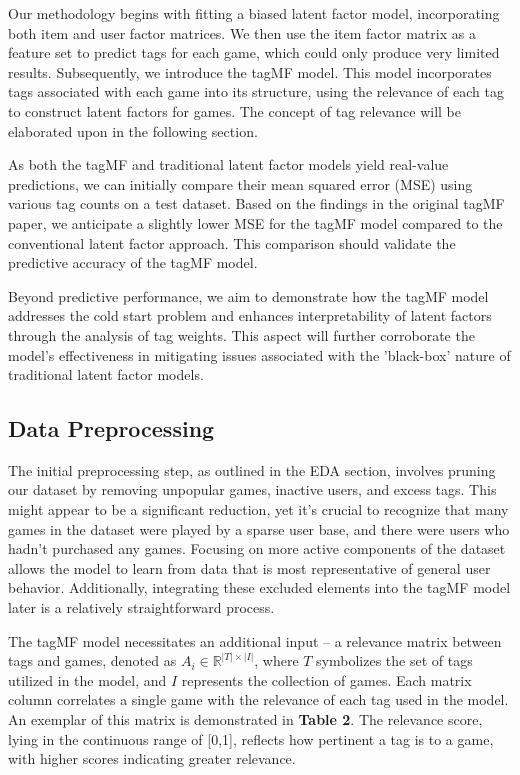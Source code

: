 \documentclass[sigplan,screen]{acmart}
\begin{document}
Our methodology begins with fitting a biased latent factor model, incorporating both item and user factor matrices. We then use the item factor matrix as a feature set to predict tags for each game, which could only produce very limited results. Subsequently, we introduce the tagMF model. This model incorporates tags associated with each game into its structure, using the relevance of each tag to construct latent factors for games. The concept of tag relevance will be elaborated upon in the following section.

As both the tagMF and traditional latent factor models yield real-value predictions, we can initially compare their mean squared error (MSE) using various tag counts on a test dataset. Based on the findings in the original tagMF paper, we anticipate a slightly lower MSE for the tagMF model compared to the conventional latent factor approach. This comparison should validate the predictive accuracy of the tagMF model.

Beyond predictive performance, we aim to demonstrate how the tagMF model addresses the cold start problem and enhances interpretability of latent factors through the analysis of tag weights. This aspect will further corroborate the model's effectiveness in mitigating issues associated with the 'black-box' nature of traditional latent factor models.

\subsection{Data Preprocessing}
The initial preprocessing step, as outlined in the EDA section, involves pruning our dataset by removing unpopular games, inactive users, and excess tags. This might appear to be a significant reduction, yet it's crucial to recognize that many games in the dataset were played by a sparse user base, and there were users who hadn't purchased any games. Focusing on more active components of the dataset allows the model to learn from data that is most representative of general user behavior. Additionally, integrating these excluded elements into the tagMF model later is a relatively straightforward process.

The tagMF model\cite{LOEPP201921} necessitates an additional input – a relevance matrix between tags and games, denoted as $A_i \in \mathbb{R}^{|T| \times |I|}$, where $T$ symbolizes the set of tags utilized in the model, and $I$ represents the collection of games. Each matrix column correlates a single game with the relevance of each tag used in the model. An exemplar of this matrix is demonstrated in \textbf{Table 2}. The relevance score, lying in the continuous range of [0,1], reflects how pertinent a tag is to a game, with higher scores indicating greater relevance.
\end{document}
